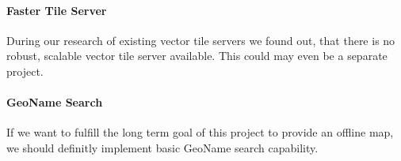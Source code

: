 \paragraph{Faster Tile Server}
During our research of existing vector tile servers we found out, that there is no robust, scalable vector tile server available. This could may even be a separate project.

\paragraph{GeoName Search}
If we want to fulfill the long term goal of this project to provide an offline map, we should definitly implement basic GeoName search capability.

\newpage{}